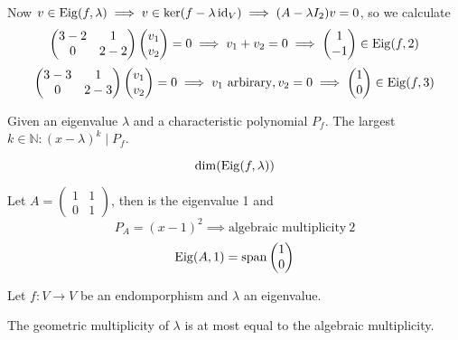 \begin{example}
   Now \(v \in \operatorname{Eig}(f, \lambda) \implies v \in \ker(f - \lambda\operatorname{id}_V) \implies (A - \lambda I_2)v = 0\), so we calculate
   \[\begin{pmatrix}3 - 2&1\\0&2 - 2\end{pmatrix} \begin{pmatrix}v_1\\v_2\end{pmatrix} = 0 \implies v_1 + v_2 = 0 \implies \begin{pmatrix}1\\-1\end{pmatrix} \in \operatorname{Eig}(f, 2)\]
   \[\begin{pmatrix}3 - 3&1\\0&2 - 3\end{pmatrix} \begin{pmatrix}v_1\\v_2\end{pmatrix} = 0 \implies v_1~\text{arbirary}, v_2 = 0 \implies \begin{pmatrix}1\\0\end{pmatrix} \in \operatorname{Eig}(f, 3)\]
\end{example}

\begin{definition}
   Given an eigenvalue \(\lambda\) and a characteristic polynomial \(P_f\).
   The largest \(k \in \mathbb{N}: (x - \lambda)^k \mid P_f\).
\end{definition}
\begin{definition}
   \[\dim(\operatorname{Eig}(f, \lambda))\]
\end{definition}
\begin{example}
   Let \(A = \begin{pmatrix}1&1\\0&1\end{pmatrix}\), then is the eigenvalue 1 and
   \[P_A = (x - 1)^2 \implies \text{algebraic multiplicity}~2\]
   \[\operatorname{Eig}(A, 1) = \operatorname{span}\begin{pmatrix}1\\0\end{pmatrix}\]
\end{example}

\begin{proposition}
   Let \(f: V \to V\) be an endomporphism and \(\lambda\) an eigenvalue.

   The geometric multiplicity of \(\lambda\) is at most equal to the algebraic multiplicity.
\end{proposition}

